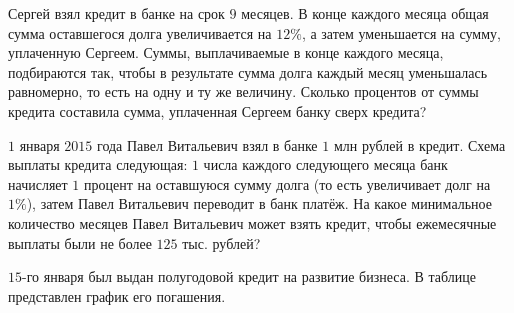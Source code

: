 \begin{class}[number=9]
	\begin{listofex}
		\item Сергей взял кредит в банке на срок \(9\) месяцев. В конце каждого месяца общая сумма оставшегося долга увеличивается на \(12\%\), а затем уменьшается на сумму, уплаченную Сергеем. Суммы, выплачиваемые в конце каждого месяца, подбираются так, чтобы в результате сумма долга каждый месяц уменьшалась равномерно, то есть на одну и ту же величину. Сколько процентов от суммы кредита составила сумма, уплаченная Сергеем банку сверх кредита?
		\item \(1\) января \(2015\) года Павел Витальевич взял в банке \(1\) млн рублей в кредит. Схема выплаты кредита следующая: \(1\) числа каждого следующего месяца банк начисляет \(1\) процент на оставшуюся сумму долга (то есть увеличивает долг на \(1\%\)), затем Павел Витальевич переводит в банк платёж. На какое минимальное количество месяцев Павел Витальевич может взять кредит, чтобы ежемесячные выплаты были не более \(125\) тыс. рублей?
		\item \(15\)-го января был выдан полугодовой кредит на развитие бизнеса. В таблице представлен график его погашения. \\

\end{listofex}
\end{class}
